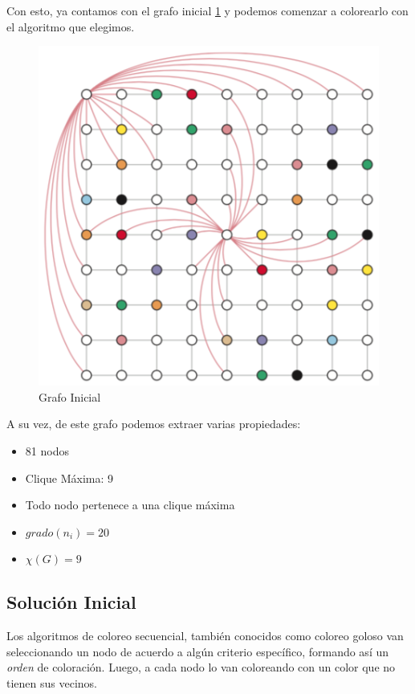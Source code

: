 \documentclass[a4paper,spanish]{article}
\begin{document}
\clearpage

Con esto, ya contamos con el grafo inicial \ref{img:grafo_inicial} y podemos
comenzar a colorearlo con el algoritmo que elegimos.

\begin{figure}[h]
	\centering
	\includegraphics[scale=0.5]{./img/grafo_inicial.png}
    \caption{Grafo Inicial}
    \label{img:grafo_inicial}
\end{figure}

A su vez, de este grafo podemos extraer varias propiedades:

\begin{itemize}
	\item 81 nodos
	\item Clique Máxima: 9
	\item Todo nodo pertenece a una clique máxima
	\item $ grado(n_i) = 20 $
	\item $ \chi(G) = 9 $
\end{itemize}


\subsection{Solución Inicial}

Los algoritmos de coloreo secuencial, también conocidos como coloreo goloso van seleccionando un nodo
de acuerdo a algún criterio específico, formando así un \emph{orden} de coloración.
Luego, a cada nodo lo van coloreando con un color que no tienen sus vecinos.
 
\end{document}
